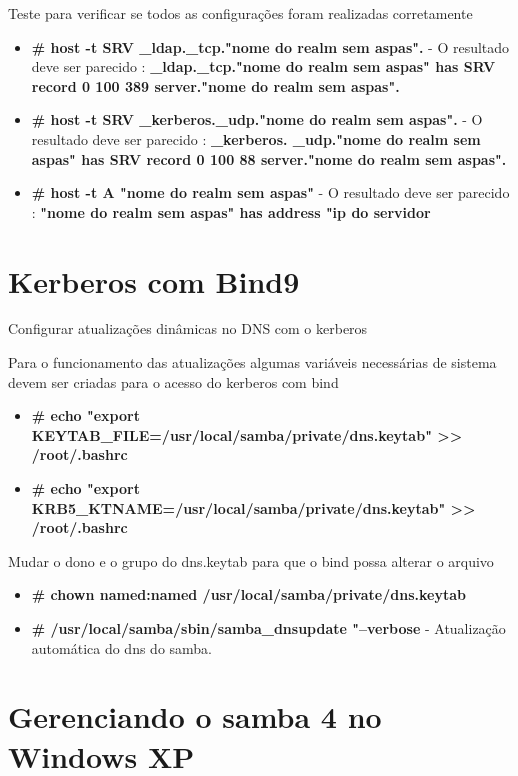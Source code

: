 Teste para verificar se todos as configurações foram realizadas corretamente

\begin{itemize}
	\item \textbf{\# host -t SRV \_ldap.\_tcp."nome do realm sem aspas".} - O resultado deve ser parecido : \textbf{\_ldap.\_tcp."nome do realm sem aspas" has SRV record 0 100 389 server."nome do realm sem aspas".}
	\item \textbf{\# host -t SRV \_kerberos.\_udp."nome do realm sem aspas".} - O resultado deve ser parecido : \textbf{\_kerberos. \_udp."nome do realm sem aspas" has SRV record 0 100 88 server."nome do realm sem aspas".}
	\item \textbf{\# host -t A "nome do realm sem aspas"} - O resultado deve ser parecido : \textbf{"nome do realm sem aspas" has address "ip do servidor}
\end{itemize}

\section{Kerberos com Bind9}

Configurar atualizações dinâmicas no DNS com o kerberos

Para o funcionamento das atualizações algumas variáveis necessárias de sistema devem ser criadas para o acesso do kerberos com bind

\begin{itemize}
	\item \textbf{\# echo "export KEYTAB\_FILE=/usr/local/samba/private/dns.keytab" >> /root/.bashrc}
	\item \textbf{\# echo "export KRB5\_KTNAME=/usr/local/samba/private/dns.keytab" >> /root/.bashrc}
\end{itemize}

Mudar o dono e o grupo do dns.keytab para que o bind possa alterar o arquivo

\begin{itemize}
	\item \textbf{\# chown named:named /usr/local/samba/private/dns.keytab}
	\item \textbf{\# /usr/local/samba/sbin/samba\_dnsupdate "--verbose} - Atualização automática do dns do samba.
\end{itemize}

\section{Gerenciando o samba 4 no Windows XP}

